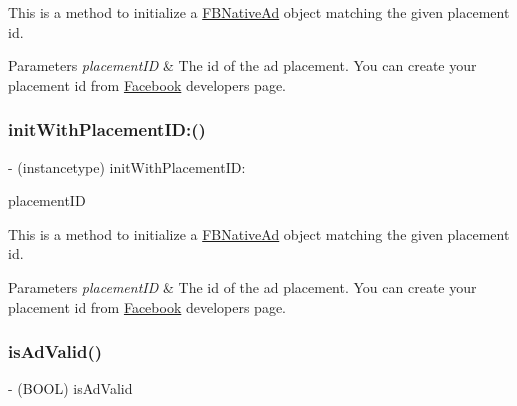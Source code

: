 This is a method to initialize a \hyperlink{interfaceFBNativeAd}{F\+B\+Native\+Ad} object matching the given placement id.


\begin{DoxyParams}{Parameters}
{\em placement\+ID} & The id of the ad placement. You can create your placement id from \hyperlink{interfaceFacebook}{Facebook} developers page. \\
\hline
\end{DoxyParams}
\mbox{\label{interfaceFBNativeAd_af90f836b1fae6e994657a1d1d3724922}} 
\subsubsection{\texorpdfstring{init\+With\+Placement\+I\+D\+:()}{initWithPlacementID:()}\hspace{0.1cm}{\footnotesize\ttfamily [5/5]}}
{\footnotesize\ttfamily -\/ (instancetype) init\+With\+Placement\+I\+D\+: \begin{DoxyParamCaption}\item[{(N\+S\+String $\ast$)}]{placement\+ID }\end{DoxyParamCaption}}

This is a method to initialize a \hyperlink{interfaceFBNativeAd}{F\+B\+Native\+Ad} object matching the given placement id.


\begin{DoxyParams}{Parameters}
{\em placement\+ID} & The id of the ad placement. You can create your placement id from \hyperlink{interfaceFacebook}{Facebook} developers page. \\
\hline
\end{DoxyParams}
\mbox{\label{interfaceFBNativeAd_ab7ac5c53be873134d4ad5082e542754d}} 
\subsubsection{\texorpdfstring{is\+Ad\+Valid()}{isAdValid()}\hspace{0.1cm}{\footnotesize\ttfamily [1/5]}}
{\footnotesize\ttfamily -\/ (B\+O\+OL) is\+Ad\+Valid \begin{DoxyParamCaption}{ }\end{DoxyParamCaption}}

